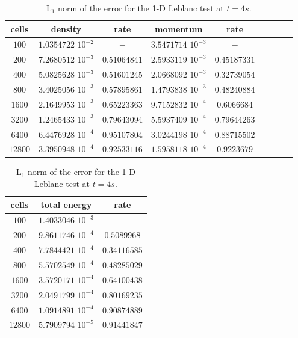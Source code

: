 \begin{table}[H]
\begin{center}
 \caption{\label{tbl:l1_norm_leblanc} L$_1$ norm of the error for the 1-D Leblanc test at $t=4s$.}
 \begin{tabular}{|c|c|c|c|c|c|c|c|c|}
 \hline
  cells & density               & rate         & momentum              & rate         \\ \hline 
$100$   & $1.0354722$ $10^{-2}$ & $-$          & $3.5471714$ $10^{-3}$ & $-$       \\  \hline
$200$   & $7.2680512$ $10^{-3}$ & $0.51064841$ & $2.5933119$ $10^{-3}$ & $0.45187331$  \\ \hline
$400$   & $5.0825628$ $10^{-3}$ & $0.51601245$ & $2.0668092$ $10^{-3}$ & $0.32739054$  \\ \hline
$800$   & $3.4025056$ $10^{-3}$ & $0.57895861$ & $1.4793838$ $10^{-3}$ & $0.48240884$  \\ \hline
$1600$  & $2.1649953$ $10^{-3}$ & $0.65223363$ & $9.7152832$ $10^{-4}$ & $0.6066684$   \\ \hline
$3200$  & $1.2465433$ $10^{-3}$ & $0.79643094$ & $5.5937409$ $10^{-4}$ & $0.79644263$ \\ \hline
$6400$  & $6.4476928$ $10^{-4}$ & $0.95107804$ & $3.0244198$ $10^{-4}$ & $0.88715502$ \\ \hline
$12800$ & $3.3950948$ $10^{-4}$ & $0.92533116$ & $1.5958118$ $10^{-4}$ & $0.9223679$  \\ \hline
\end{tabular}
\begin{tabular}{|c|c|c|}
\hline
cells & total energy          & rate         \\  \hline
$100$   & $1.4033046$ $10^{-3}$ & $-$          \\  \hline
$200$   & $9.8611746$ $10^{-4}$ & $0.5089968$  \\  \hline
$400$   & $7.7844421$ $10^{-4}$ & $0.34116585$ \\  \hline
$800$   & $5.5702549$ $10^{-4}$ & $0.48285029$ \\  \hline
$1600$   & $3.5720171$ $10^{-4}$ & $0.64100438$ \\  \hline
$3200$   & $2.0491799$ $10^{-4}$ & $0.80169235$ \\  \hline
$6400$   & $1.0914891$ $10^{-4}$ & $0.90874889$ \\  \hline
$12800$   & $5.7909794$ $10^{-5}$ & $0.91441847$ \\  \hline
 \end{tabular}
\end{center}
\end{table}
